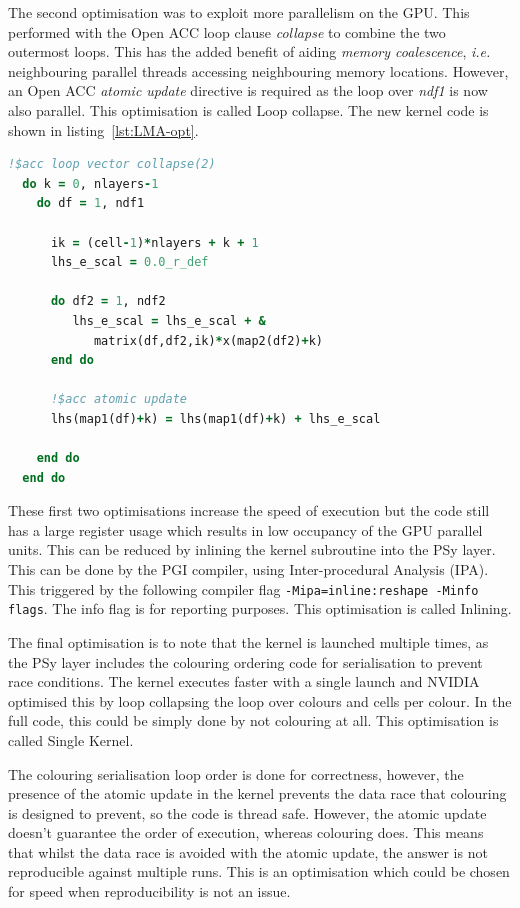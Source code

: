 The second optimisation was to exploit more parallelism on the GPU.
This performed with the Open ACC loop clause {\em collapse} to combine
the two outermost loops. This has the added benefit of aiding {\em
  memory coalescence}, {\em i.e.} neighbouring parallel threads
accessing neighbouring memory locations. However, an Open ACC {\em
  atomic update} directive is required as the loop over {\em ndf1} is
now also parallel. This optimisation is called Loop collapse. The new
kernel code is shown in listing~\ref{lst:LMA-opt}. 

\begin{lstlisting}[language=Fortran,caption={Optimised
    kernel},label={lst:LMA-opt}]
  !$acc loop vector collapse(2)
  do k = 0, nlayers-1
    do df = 1, ndf1

      ik = (cell-1)*nlayers + k + 1
      lhs_e_scal = 0.0_r_def

      do df2 = 1, ndf2
         lhs_e_scal = lhs_e_scal + & 
            matrix(df,df2,ik)*x(map2(df2)+k)
      end do
      
      !$acc atomic update
      lhs(map1(df)+k) = lhs(map1(df)+k) + lhs_e_scal

    end do
  end do
\end{lstlisting}

These first two optimisations increase the speed of execution but the
code still has a large register usage which results in low occupancy
of the GPU parallel units. This can be reduced by inlining the kernel
subroutine into the PSy layer. This can be done by the PGI compiler,
using Inter-procedural Analysis (IPA). This triggered by the following
compiler flag \verb+-Mipa=inline:reshape -Minfo flags+. The info flag
is for reporting purposes. This optimisation is called Inlining. 

The final optimisation is to note that the kernel is launched multiple
times, as the PSy layer includes the colouring ordering code for serialisation
to prevent race conditions. The kernel executes faster with a
single launch and NVIDIA optimised this by loop collapsing the loop
over colours and cells per colour. In the full code, this could be
simply done by not colouring at all. This optimisation is called
Single Kernel.

The colouring serialisation loop order is done for correctness,
however, the presence of the atomic update in the kernel prevents the
data race that colouring is designed to prevent, so the code is thread
safe. However, the atomic update doesn't guarantee the order of
execution, whereas colouring does. This means that whilst the data
race is avoided with the atomic update, the answer is not reproducible against
multiple runs. This is an optimisation which could be chosen for speed
when reproducibility is not an issue.

